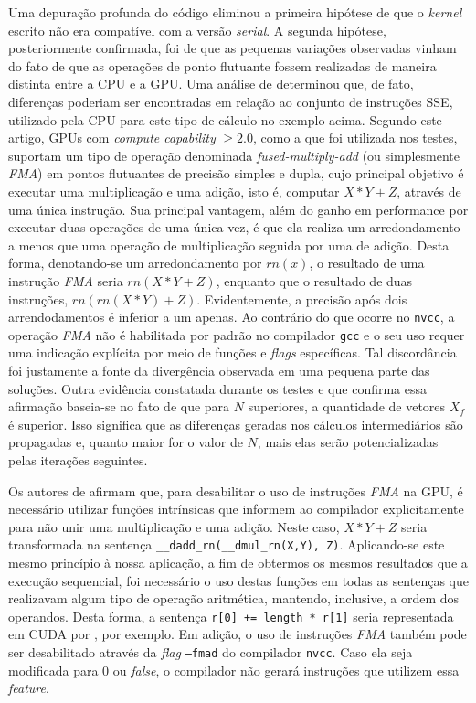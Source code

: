 \documentclass[12pt]{article}
\begin{document}
Uma depuração profunda do código eliminou a primeira hipótese de que o
\textit{kernel} escrito não era compatível com a versão \textit{serial}. A
segunda hipótese, posteriormente confirmada, foi de que as pequenas variações
observadas vinham do fato de que as operações de ponto flutuante fossem
realizadas de maneira distinta entre a CPU e a GPU. Uma análise de
\cite{ieee754} determinou que, de fato, diferenças poderiam ser encontradas em
relação ao conjunto de instruções SSE, utilizado pela CPU para este tipo de
cálculo no exemplo acima. Segundo este artigo, GPUs com \textit{compute
capability} \(\ge2.0\), como a que foi utilizada nos testes, suportam um tipo de
operação denominada \textit{fused-multiply-add} (ou simplesmente \textit{FMA})
em pontos flutuantes de precisão simples e dupla, cujo principal objetivo é
executar uma multiplicação e uma adição, isto é, computar \(X * Y + Z\), através
de uma única instrução. Sua principal vantagem, além do ganho em performance por
executar duas operações de uma única vez, é que ela realiza um arredondamento a
menos que uma operação de multiplicação seguida por uma de adição. Desta forma,
denotando-se um arredondamento por \(rn(x)\), o resultado de uma instrução
\textit{FMA} seria \(rn(X*Y+Z)\), enquanto que o resultado de duas instruções,
\(rn(rn(X*Y) + Z)\). Evidentemente, a precisão após dois arrendodamentos é
inferior a um apenas. Ao contrário do que ocorre no \texttt{nvcc}, a operação
\textit{FMA} não é habilitada por padrão no compilador \texttt{gcc} e o seu uso
requer uma indicação explícita por meio de funções e \textit{flags} específicas.
Tal discordância foi justamente a fonte da divergência observada em uma pequena
parte das soluções. Outra evidência constatada durante os testes e que confirma
essa afirmação baseia-se no fato de que para \(N\) superiores, a quantidade de
vetores \(X_f\) é superior. Isso significa que as diferenças geradas nos
cálculos intermediários são propagadas e, quanto maior for o valor de \(N\),
mais elas serão potencializadas pelas iterações seguintes.

Os autores de \cite{ieee754} afirmam que, para desabilitar o uso de instruções
\textit{FMA} na GPU, é necessário utilizar funções intrínsicas que informem ao
compilador explicitamente para não unir uma multiplicação e uma adição. Neste
caso, \(X*Y + Z\) seria transformada na sentença
\texttt{\_\_dadd\_rn(\_\_dmul\_rn(X,Y), Z)}. Aplicando-se este
mesmo princípio à nossa aplicação,  a fim de obtermos os mesmos resultados
que a execução sequencial, foi necessário o uso destas funções em todas as
sentenças que realizavam algum tipo de operação aritmética, mantendo,
inclusive, a ordem dos operandos. Desta forma, a sentença \texttt{r[0] +=
length * r[1]} seria representada em CUDA por , por exemplo. Em adição, o uso de instruções
\textit{FMA} também pode ser desabilitado através da \textit{flag}
\texttt{--fmad} do compilador \texttt{nvcc}. Caso ela seja modificada para 0 ou
\textit{false}, o compilador não gerará instruções que utilizem essa
\textit{feature}.
\end{document}
